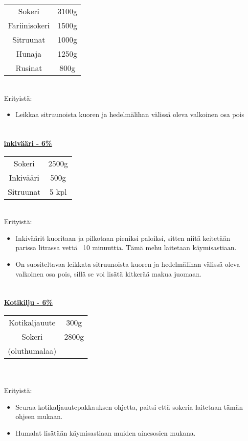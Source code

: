\documentclass[20pt, a4]{article}
\begin{document}
{    \begin{tabular}{ cc } 
        Sokeri & 3100g \\
        Fariinisokeri & 1500g\\
        Sitruunat & 1000g \\
        Hunaja & 1250g \\
        Rusinat & 800g
    \end{tabular}
    \\

    Erityistä:
    \begin{itemize}
        \item Leikkaa sitruunoista kuoren ja hedelmälihan välissä oleva valkoinen osa pois
    \end{itemize}

    \pagebreak
    \section{}


    \underline{\textbf{inkivääri - 6\%}}

    \begin{tabular}{ cc } 
    Sokeri & 2500g\\
    Inkivääri & 500g\\
    Sitruunat & 5 kpl\\

    \end{tabular}
    \\

    Erityistä:
    \begin{itemize}
        \item Inkiväärit kuoritaan ja pilkotaan pieniksi paloiksi, sitten niitä keitetään parissa litrassa vettä ~10 minuuttia. Tämä mehu laitetaan käymisastiaan. 
        \item On suositeltavaa leikkata sitruunoista kuoren ja hedelmälihan välissä oleva valkoinen osa pois, sillä se voi lisätä kitkerää makua juomaan.
    \end{itemize}
    
    \pagebreak
    \section{}
    \underline{\textbf{Kotikilju - 6\%}}


    \begin{tabular}{ cc } 
        Kotikaljauute & 300g\\
        Sokeri & 2800g\\
        (oluthumalaa)&
    \end{tabular}
    \\
    \\
    Erityistä:
    \begin{itemize}
        \item Seuraa kotikaljauutepakkauksen ohjetta, paitsi että sokeria laitetaan tämän ohjeen mukaan. 
        \item Humalat lisätään käymisastiaan muiden ainesosien mukana.
    \end{itemize}

}
\end{document}
